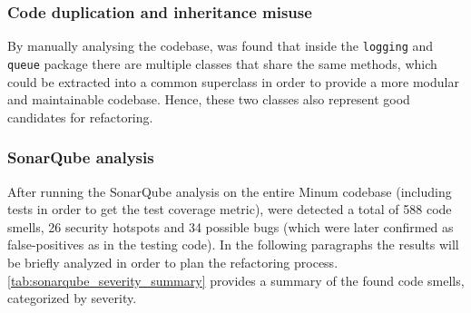 \subsubsection{Code duplication and inheritance misuse}

By manually analysing the codebase, was found that inside the \texttt{logging} and \texttt{queue} package there are multiple classes that share the same methods, which could be extracted into a common superclass in order to provide a more modular and maintainable codebase. Hence, these two classes also represent good candidates for refactoring.

\subsubsection{SonarQube analysis}

After running the SonarQube analysis on the entire Minum codebase (including tests in order to get the test coverage metric), were detected a total of 588 code smells, 26 security hotspots and 34 possible bugs (which were later confirmed as false-positives as in the testing code). In the following paragraphs the results will be briefly analyzed in order to plan the refactoring process. \autoref{tab:sonarqube_severity_summary} provides a summary of the found code smells, categorized by severity.

